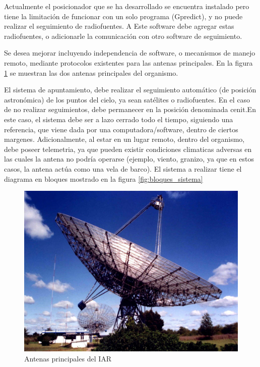 \documentclass[11pt, %
codirector, %
]{charter}
\begin{document}
Actualmente el posicionador que se ha desarrollado se encuentra instalado pero tiene la limitación de funcionar con un solo programa (Gpredict), y no puede realizar el seguimiento de radiofuentes. A Este software debe agregar estas radiofuentes, o adicionarle la comunicación con otro software de seguimiento.  

Se desea mejorar incluyendo independencia de software, o mecanismos de manejo remoto, mediante protocolos existentes para las antenas principales. En la figura \ref{fig:antenas_main} se muestran las dos antenas principales del organismo. 

El sistema de apuntamiento, debe realizar el seguimiento automático (de posición astronómica) de los puntos del cielo, ya sean satélites o radiofuentes. En el caso de no realizar seguimientos, debe permanecer en la posición denominada cenit.En este caso, el sistema debe ser a lazo cerrado todo el tiempo, siguiendo una referencia, que viene dada por una computadora/software, dentro de ciertos margenes. 
Adicionalmente, al estar en un lugar remoto, dentro del organismo, debe poseer telemetria, ya que pueden existir condiciones climaticas adversas en las cuales la antena no podría operarse (ejemplo, viento, granizo, ya que en estos casos, la antena actúa como una vela de barco). El sistema a realizar tiene el diagrama en bloques mostrado en la figura \ref{fig:bloques_sistema} 

\begin{figure}[h]
	\vspace{-0.05cm}
	\centering
	\includegraphics[scale = 0.2]{Figuras/seccion_1/antena_main.jpg}
	\caption{Antenas principales del IAR}
	\label{fig:antenas_main}
\end{figure}
\end{document}
